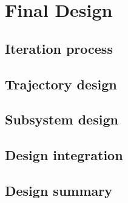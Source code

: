\section{Final Design}\label{cha:finaldesign}

\subsection{Iteration process} \label{sec:iterationprocess}


\subsection{Trajectory design} \label{sec:trajectorydesign}


\subsection{Subsystem design} \label{sec:subsystemdesign}


\subsection{Design integration} \label{sec:designintegration}


\subsection{Design summary} \label{sec:designsummary}

